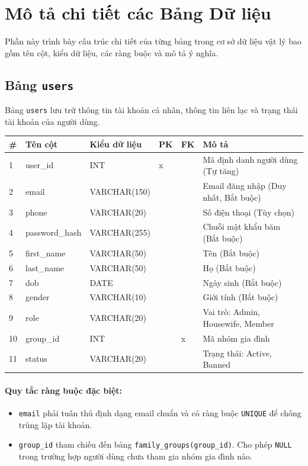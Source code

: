 \documentclass[12pt,a4paper]{article}
\begin{document}
\newpage
\section{Mô tả chi tiết các Bảng Dữ liệu}
Phần này trình bày cấu trúc chi tiết của từng bảng trong cơ sở dữ liệu vật lý bao gồm tên cột, kiểu dữ liệu, các ràng buộc và mô tả ý nghĩa.

\subsection{Bảng \texttt{users}}
Bảng \texttt{users} lưu trữ thông tin tài khoản cá nhân, thông tin liên lạc và trạng thái tài khoản của người dùng.

\begin{longtable}{|p{0.5cm}|p{3.4cm}|p{3.2cm}|p{0.7cm}|p{0.7cm}|p{3.6cm}|}
\hline
\textbf{\#} & \textbf{Tên cột} & \textbf{Kiểu dữ liệu} & \textbf{PK} & \textbf{FK} & \textbf{Mô tả} \\ \hline
\endhead
1 & user\_id & INT & x & & Mã định danh người dùng (Tự tăng) \\ \hline
2 & email & VARCHAR(150) & & & Email đăng nhập (Duy nhất, Bắt buộc) \\ \hline
3 & phone & VARCHAR(20) & & & Số điện thoại (Tùy chọn) \\ \hline
4 & password\_hash & VARCHAR(255) & & & Chuỗi mật khẩu băm (Bắt buộc) \\ \hline
5 & first\_name & VARCHAR(50) & & & Tên (Bắt buộc) \\ \hline
6 & last\_name & VARCHAR(50) & & & Họ (Bắt buộc) \\ \hline
7 & dob & DATE & & & Ngày sinh (Bắt buộc) \\ \hline
8 & gender & VARCHAR(10) & & & Giới tính (Bắt buộc) \\ \hline
9 & role & VARCHAR(20) & & & Vai trò: Admin, Housewife, Member \\ \hline
10 & group\_id & INT & & x & Mã nhóm gia đình \\ \hline
11 & status & VARCHAR(20) & & & Trạng thái: Active, Banned \\ \hline
\end{longtable}

\paragraph{Quy tắc ràng buộc đặc biệt:}
\begin{itemize}
    \item \texttt{email} phải tuân thủ định dạng email chuẩn và có ràng buộc \texttt{UNIQUE} để chống trùng lặp tài khoản.
    \item \texttt{group\_id} tham chiếu đến bảng \texttt{family\_groups(group\_id)}. Cho phép \texttt{NULL} trong trường hợp người dùng chưa tham gia nhóm gia đình nào.
\end{itemize}
\end{document}
